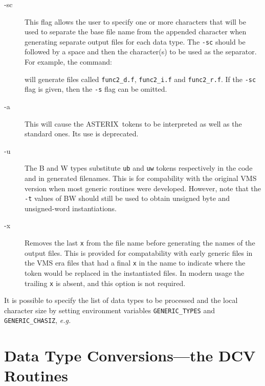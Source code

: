 \documentclass[twoside,11pt,nolof]{starlink}
\providecommand{\ASTERIX}{{\footnotesize ASTERIX}\normalsize}
\begin{document}
\begin{description}
\item[-sc] This flag allows the user to specify one or more characters
that will be used to separate the base file name from the appended
character when generating separate output files for each data type.
The \texttt{-sc} should be followed by a space and then the character(s)
to be used as the separator.  For example, the command:

\begin{terminalv}
\end{terminalv}

will generate files called \texttt{func2\_d.f}, \texttt{func2\_i.f} and \texttt{func2\_r.f}.  If the \texttt{-sc} flag is given, then the \texttt{-s} flag can be
omitted.

\item[-a] This will cause the \ASTERIX\ tokens to be interpreted as well as the
standard ones.  Its use is deprecated.

\item[-u]  The B and W types substitute \texttt{ub} and \texttt{uw} tokens
respectively in the code and in generated filenames.  This is for
compability with the original VMS version when most generic routines were
developed.  However, note that the \texttt{-t} values of BW should still be
used to obtain unsigned byte and unsigned-word instantiations.

\item[-x]  Removes the last \texttt{x} from the file name before generating the
names of the output files.  This is provided for compatability
with early generic files in the VMS era files that had a final \texttt{x} in the
name to indicate where the token would be replaced in the
instantiated files.  In modern usage the trailing \texttt{x} is absent, and
this option is not required.

\end{description}

It is possible to specify the list of data types to be processed and the local
character size by setting environment variables \texttt{GENERIC\_TYPES} and \texttt{GENERIC\_CHASIZ}, \emph{e.g.}

\begin{terminalv}
\end{terminalv}

\section{Data Type Conversions---the DCV Routines}
\end{document}

